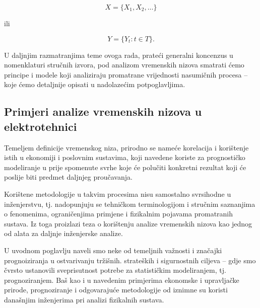 \documentclass[a4paper,12pt,oneside]{memoir}
\begin{document}
            \begin{equation}
                X=\{X_1,X_2,\ldots\}
            \end{equation}

            ili

            \begin{equation}
                Y=\{Y_t: t\in T\}.
            \end{equation}
            
            U daljnjim razmatranjima teme ovoga rada, prateći generalni koncenzus u nomenklaturi stručnih izvora, pod analizom vremenskih nizova smatrati ćemo principe i modele koji analiziraju promatrane vrijednosti nasumičnih procesa -- koje ćemo detaljnije opisati u nadolazećim potpoglavljima.

        \subsection{Primjeri analize vremenskih nizova u elektrotehnici}
            Temeljem definicije vremenskog niza, prirodno se nameće korelacija i korištenje istih u ekonomiji i poslovnim sustavima, koji navedene koriste za prognostičko modeliranje u prije spomenute svrhe koje će polučiti konkretni rezultat koji će poslije biti predmet daljnjeg proučavanja.

            Korištene metodologije u takvim procesima nisu samostalno svrsihodne u inženjerstvu, tj. nadopunjuju se tehničkom terminologijom i stručnim saznanjima o fenomenima, ograničenjima primjene i fizikalnim pojavama promatranih sustava. Iz toga proizlazi teza o korištenju analize vremenskih nizova kao jednog od alata za daljnje inženjerske analize.


            U uvodnom poglavlju naveli smo neke od temeljnih važnosti i značajki prognoiziranja u ostvarivanju tržišnih. strateških i sigurnostnih ciljeva -- gdje smo čvrsto ustanovili sveprisutnost potrebe za statističkim modeliranjem, tj. prognoziranjem. Baš kao i u navedenim primjerima ekonomske i upravljačke prirode, prognoziranje i odgovarajuće metodologije od iznimne su koristi današnjim inženjerima pri analizi fizikalnih sustava. 
            
\end{document}
